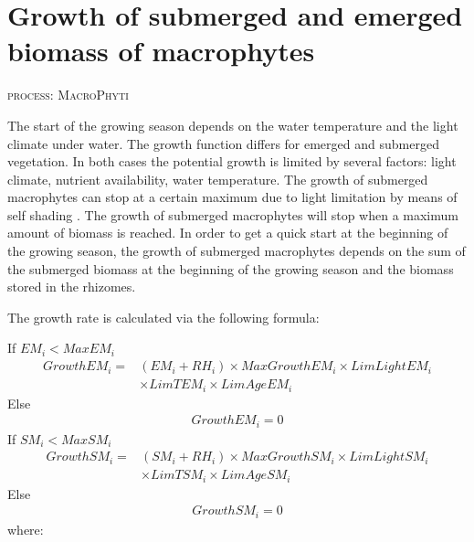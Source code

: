 \section{Growth of submerged and emerged biomass of macrophytes}
\begin{flushright}
\textsc{process: MacroPhyti}
\end{flushright}

The start of the growing season depends on the water temperature and the light climate under water. The growth
function differs for emerged and submerged vegetation. In both cases the potential growth is limited by several
factors: light climate, nutrient availability, water temperature.  The growth of submerged macrophytes can stop
at a certain maximum due to light limitation by means of self shading \citep{CaladoDuarte}.
The growth of submerged macrophytes will stop when a maximum
amount of biomass is reached. In order to get a quick start at the beginning of the growing season, the growth
of submerged macrophytes depends on the sum of the submerged biomass at the beginning of the growing season and
the biomass stored in the rhizomes.

The growth rate is calculated via the following formula:


If $EM_i < MaxEM_i$
\begin{align}
             GrowthEM_i =& (EM_i + RH_i) \times MaxGrowthEM_i \times LimLightEM_i \\
\nonumber                & \times LimTEM_i \times LimAgeEM_i
\end{align}
Else
\begin{align}
\nonumber    GrowthEM_i = 0
\end{align}
%
If $SM_i < MaxSM_i$
\begin{align}
\nonumber    GrowthSM_i =& (SM_i + RH_i) \times MaxGrowthSM_i \times LimLightSM_i \\
\nonumber                & \times LimTSM_i \times LimAgeSM_i
\end{align}
Else
\begin{align}
\nonumber    GrowthSM_i = 0
\end{align}
%
where:

